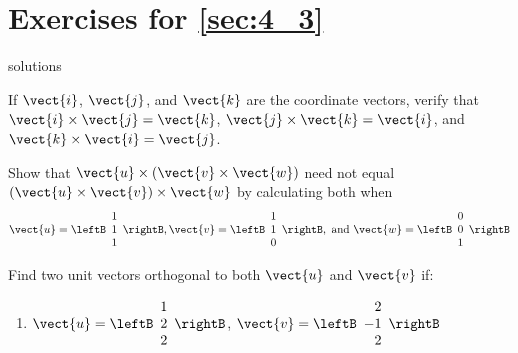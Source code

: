 \section*{Exercises for \ref{sec:4_3}}

\begin{Filesave}{solutions}
\end{Filesave}

\begin{multicols}{2}
\begin{ex}
If $\vect{i}$, $\vect{j}$, and $\vect{k}$ are the coordinate vectors, verify that $\vect{i} \times \vect{j} = \vect{k}$, $\vect{j} \times \vect{k} = \vect{i}$, and $\vect{k} \times \vect{i} = \vect{j}$.
\end{ex}

\begin{ex}
Show that $\vect{u} \times (\vect{v} \times \vect{w})$ need not equal $(\vect{u} \times \vect{v}) \times \vect{w}$ by calculating both when
\begin{equation*}
\vect{u} = \leftB
\begin{array}{r}
1\\
1\\
1
\end{array}
\rightB,
\vect{v} = \leftB
\begin{array}{r}
1\\
1\\
0
\end{array}
\rightB, \mbox{ and }
\vect{w} = \leftB
\begin{array}{r}
0\\
0\\
1
\end{array}
\rightB
\end{equation*}
\end{ex}

\begin{ex}
Find two unit vectors orthogonal to both $\vect{u}$ and $\vect{v}$ if:


\begin{enumerate}[label={\alph*.}]
\item 
$\vect{u} = \leftB
\begin{array}{r}
1\\
2\\
2
\end{array}
\rightB$, 
$\vect{v} = \leftB
\begin{array}{r}
2\\
-1\\
2
\end{array}
\rightB$


\end{enumerate}
\end{ex}
\end{multicols}
